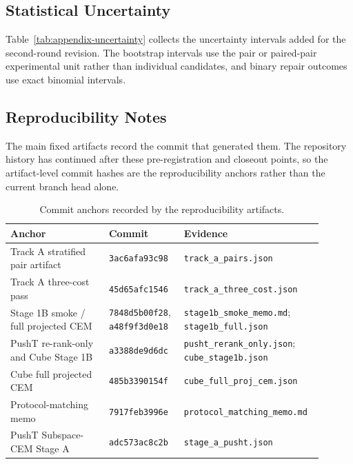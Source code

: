 \subsection{Statistical Uncertainty}

Table~\ref{tab:appendix-uncertainty} collects the uncertainty intervals added
for the second-round revision.  The bootstrap intervals use the pair or
paired-pair experimental unit rather than individual candidates, and binary
repair outcomes use exact binomial intervals.



\subsection{Reproducibility Notes}

The main fixed artifacts record the commit that generated them. The repository
history has continued after these pre-registration and closeout points, so the
artifact-level commit hashes are the reproducibility anchors rather than the
current branch head alone.

\begin{table}[h]
\centering
\scriptsize
\begin{tabular}{p{0.30\linewidth}p{0.22\linewidth}p{0.38\linewidth}}
\toprule
Anchor & Commit & Evidence \\
\midrule
Track A stratified pair artifact & \texttt{3ac6afa93c98} & \texttt{track\_a\_pairs.json} \\
Track A three-cost pass & \texttt{45d65afc1546} & \texttt{track\_a\_three\_cost.json} \\
Stage 1B smoke / full projected CEM & \texttt{7848d5b00f28}, \texttt{a48f9f3d0e18} & \texttt{stage1b\_smoke\_memo.md}; \texttt{stage1b\_full.json} \\
PushT re-rank-only and Cube Stage 1B & \texttt{a3388de9d6dc} & \texttt{pusht\_rerank\_only.json}; \texttt{cube\_stage1b.json} \\
Cube full projected CEM & \texttt{485b3390154f} & \texttt{cube\_full\_proj\_cem.json} \\
Protocol-matching memo & \texttt{7917feb3996e} & \texttt{protocol\_matching\_memo.md} \\
PushT Subspace-CEM Stage A & \texttt{adc573ac8c2b} & \texttt{stage\_a\_pusht.json} \\
\bottomrule
\end{tabular}
\caption{Commit anchors recorded by the reproducibility artifacts.}
\label{tab:appendix-commits}
\end{table}

